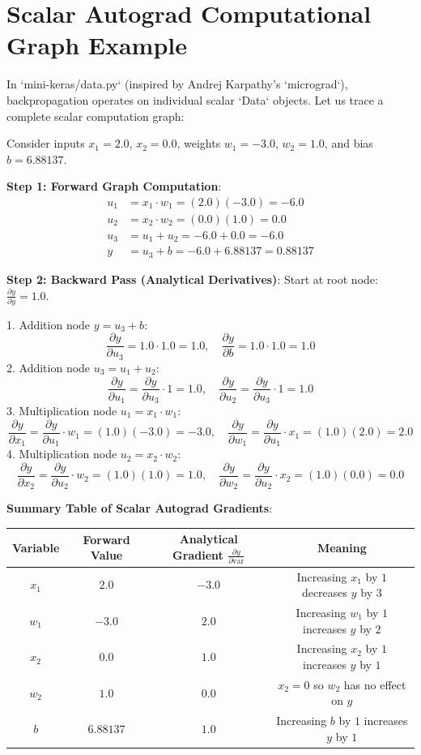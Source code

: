 \documentclass[12pt, a4paper]{report}
\theoremstyle{definition}
\begin{document}
\section{Scalar Autograd Computational Graph Example}

In `mini-keras/data.py` (inspired by Andrej Karpathy's `micrograd`), backpropagation operates on individual scalar `Data` objects. Let us trace a complete scalar computation graph:

Consider inputs $x_1 = 2.0$, $x_2 = 0.0$, weights $w_1 = -3.0$, $w_2 = 1.0$, and bias $b = 6.88137$.

\textbf{Step 1: Forward Graph Computation}:
\begin{align*}
    u_1 &= x_1 \cdot w_1 = (2.0)(-3.0) = -6.0 \\
    u_2 &= x_2 \cdot w_2 = (0.0)(1.0) = 0.0 \\
    u_3 &= u_1 + u_2 = -6.0 + 0.0 = -6.0 \\
    y &= u_3 + b = -6.0 + 6.88137 = \boxed{0.88137}
\end{align*}

\textbf{Step 2: Backward Pass (Analytical Derivatives)}:
Start at root node: $\frac{\partial y}{\partial y} = 1.0$.

1. Addition node $y = u_3 + b$:
   \[
   \frac{\partial y}{\partial u_3} = 1.0 \cdot 1.0 = \boxed{1.0}, \quad \frac{\partial y}{\partial b} = 1.0 \cdot 1.0 = \boxed{1.0}
   \]
2. Addition node $u_3 = u_1 + u_2$:
   \[
   \frac{\partial y}{\partial u_1} = \frac{\partial y}{\partial u_3} \cdot 1 = \boxed{1.0}, \quad \frac{\partial y}{\partial u_2} = \frac{\partial y}{\partial u_3} \cdot 1 = \boxed{1.0}
   \]
3. Multiplication node $u_1 = x_1 \cdot w_1$:
   \[
   \frac{\partial y}{\partial x_1} = \frac{\partial y}{\partial u_1} \cdot w_1 = (1.0)(-3.0) = \boxed{-3.0}, \quad \frac{\partial y}{\partial w_1} = \frac{\partial y}{\partial u_1} \cdot x_1 = (1.0)(2.0) = \boxed{2.0}
   \]
4. Multiplication node $u_2 = x_2 \cdot w_2$:
   \[
   \frac{\partial y}{\partial x_2} = \frac{\partial y}{\partial u_2} \cdot w_2 = (1.0)(1.0) = \boxed{1.0}, \quad \frac{\partial y}{\partial w_2} = \frac{\partial y}{\partial u_2} \cdot x_2 = (1.0)(0.0) = \boxed{0.0}
   \]

\textbf{Summary Table of Scalar Autograd Gradients}:
\begin{center}
\renewcommand{\arraystretch}{1.3}
\begin{tabular}{cccc}
\toprule
\textbf{Variable} & \textbf{Forward Value} & \textbf{Analytical Gradient $\frac{\partial y}{\partial \text{var}}$} & \textbf{Meaning} \\
\midrule
$x_1$ & $2.0$ & $-3.0$ & Increasing $x_1$ by $1$ decreases $y$ by $3$ \\
$w_1$ & $-3.0$ & $2.0$ & Increasing $w_1$ by $1$ increases $y$ by $2$ \\
$x_2$ & $0.0$ & $1.0$ & Increasing $x_2$ by $1$ increases $y$ by $1$ \\
$w_2$ & $1.0$ & $0.0$ & $x_2=0$ so $w_2$ has no effect on $y$ \\
$b$ & $6.88137$ & $1.0$ & Increasing $b$ by $1$ increases $y$ by $1$ \\
\bottomrule
\end{tabular}
\end{center}
\end{document}
